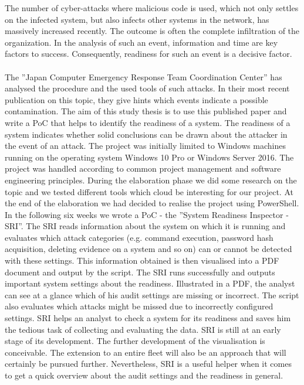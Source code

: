 \thispagestyle{plain}
\renewcommand\section{\stdsection}
\vspace{-0.25cm}
\thispagestyle{plain}
The number of cyber-attacks where malicious code is used, which not only settles on the infected system, but also infects other systems in the network, has massively increased recently. The outcome is often the complete infiltration of the organization. In the analysis of such an event, information and time are key factors to success. Consequently, readiness for such an event is a decisive factor. \\\\
The ''Japan Computer Emergency Response Team Coordination Center'' has analysed the procedure and the used tools of such attacks. In their most recent publication on this topic, they give hints which events indicate a possible contamination. The aim of this study thesis is to use this published paper and write a PoC that helps to identify the readiness of a system. The readiness of a system indicates whether solid conclusions can be drawn about the attacker in the event of an attack.
\vspace{-0.25cm}
\thispagestyle{plain}
The project was initially limited to Windows machines running on the operating system Windows 10 Pro or Windows Server 2016. The project was handled according to common project management and software engineering principles. During the elaboration phase we did some research on the topic and we tested different tools which cloud be interesting for our project. At the end of the elaboration we had decided to realise the project using PowerShell. In the following six weeks we wrote a PoC - the ''System Readiness Inspector - SRI''. The SRI reads information about the system on which it is running and evaluates which attack categories (e.g. command execution, password hash acquisition, deleting evidence on a system and so on) can or cannot be detected with these settings. This information obtained is then visualised into a PDF document and output by the script.
\vspace{-0.25cm}
\thispagestyle{plain}
The SRI runs successfully and outputs important system settings about the readiness. Illustrated in a PDF, the analyst can see at a glance which of his audit settings are missing or incorrect. The script also evaluates which attacks might be missed due to incorrectly configured settings. SRI helps an analyst to check a system for its readiness and saves him the tedious task of collecting and evaluating the data.
\vspace{-0.25cm}
\thispagestyle{plain}
SRI is still at an early stage of its development. The further development of the visualisation is conceivable. The extension to an entire fleet will also be an approach that will certainly be pursued further. Nevertheless, SRI is a useful helper when it comes to get a quick overview about the audit settings and the readiness in general.



\renewcommand\section{\clearpage\stdsection}